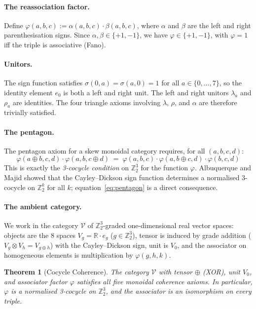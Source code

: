 \documentclass[11pt,a4paper]{article}
\newtheorem{theorem}{Theorem}[section]
\theoremstyle{definition}
\theoremstyle{remark}
\newcommand{\ZZ}{\mathbb{Z}}
\newcommand{\RR}{\mathbb{R}}
\begin{document}
\paragraph{The reassociation factor.}
Define $\varphi(a,b,c) := \alpha(a,b,c) \cdot \beta(a,b,c)$, where
$\alpha$ and $\beta$ are the left and right parenthesisation signs.
Since $\alpha, \beta \in \{+1, -1\}$, we have
$\varphi \in \{+1, -1\}$, with $\varphi = 1$ iff the triple is
associative (Fano).

\paragraph{Unitors.}
The sign function satisfies $\sigma(0, a) = \sigma(a, 0) = 1$ for
all $a \in \{0, \ldots, 7\}$, so the identity element $e_0$ is both
a left and right unit. The left and right unitors $\lambda_a$ and
$\rho_a$ are identities. The four triangle axioms involving $\lambda$,
$\rho$, and $\alpha$ are therefore trivially satisfied.

\paragraph{The pentagon.}
The pentagon axiom for a skew monoidal category requires, for all
$(a,b,c,d)$:
\begin{equation}\label{eq:pentagon}
  \varphi(a \oplus b, c, d) \cdot \varphi(a, b, c \oplus d)
  \;=\;
  \varphi(a, b, c) \cdot \varphi(a, b \oplus c, d) \cdot \varphi(b, c, d)
\end{equation}
This is exactly the \emph{3-cocycle condition} on $\ZZ_2^3$ for the
function $\varphi$. Albuquerque and Majid \cite{albuquerque1999}
showed that the Cayley--Dickson sign function determines a normalised
3-cocycle on $\ZZ_2^k$ for all $k$; equation~\eqref{eq:pentagon} is a
direct consequence.

\paragraph{The ambient category.}
We work in the category $\mathcal{V}$ of $\ZZ_2^3$-graded
one-dimensional real vector spaces: objects are the 8 spaces
$V_g = \RR \cdot e_g$ ($g \in \ZZ_2^3$), tensor is induced by
grade addition ($V_g \otimes V_h = V_{g \oplus h}$) with the
Cayley--Dickson sign, unit is $V_0$, and the associator on
homogeneous elements is multiplication by $\varphi(g,h,k)$.

\begin{theorem}[Cocycle Coherence]\label{thm:coherence}
The category $\mathcal{V}$ with tensor $\oplus$ (XOR), unit $V_0$,
and associator factor $\varphi$ satisfies all five monoidal coherence
axioms. In particular, $\varphi$ is a normalised 3-cocycle on
$\ZZ_2^3$, and the associator is an isomorphism on every triple.
\end{theorem}
\end{document}
